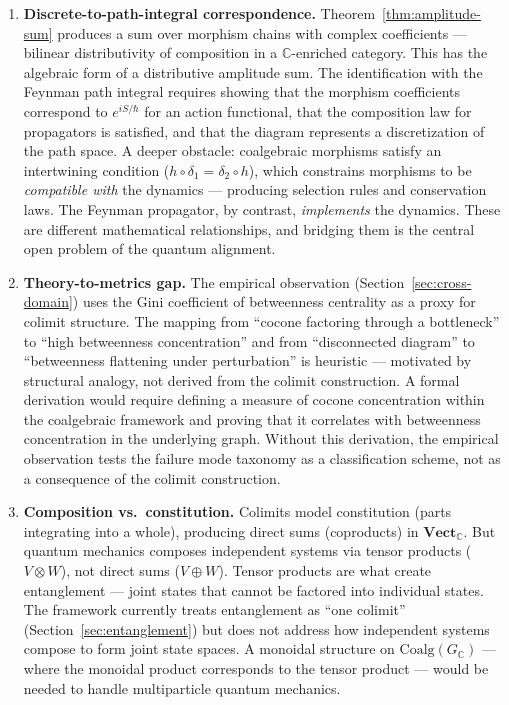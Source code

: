 \documentclass[12pt,a4paper]{article}
\begin{document}
\begin{enumerate}
  \item \label{pp:discrete-to-pi} \textbf{Discrete-to-path-integral correspondence.} Theorem~\ref{thm:amplitude-sum} produces a sum over morphism chains with complex coefficients --- bilinear distributivity of composition in a $\mathbb{C}$-enriched category. This has the algebraic form of a distributive amplitude sum. The identification with the Feynman path integral requires showing that the morphism coefficients correspond to $e^{iS/\hbar}$ for an action functional, that the composition law for propagators is satisfied, and that the diagram represents a discretization of the path space. A deeper obstacle: coalgebraic morphisms satisfy an intertwining condition ($h \circ \delta_1 = \delta_2 \circ h$), which constrains morphisms to be \emph{compatible with} the dynamics --- producing selection rules and conservation laws. The Feynman propagator, by contrast, \emph{implements} the dynamics. These are different mathematical relationships, and bridging them is the central open problem of the quantum alignment.

  \item \label{pp:theory-metrics} \textbf{Theory-to-metrics gap.} The empirical observation (Section~\ref{sec:cross-domain}) uses the Gini coefficient of betweenness centrality as a proxy for colimit structure. The mapping from ``cocone factoring through a bottleneck'' to ``high betweenness concentration'' and from ``disconnected diagram'' to ``betweenness flattening under perturbation'' is heuristic --- motivated by structural analogy, not derived from the colimit construction. A formal derivation would require defining a measure of cocone concentration within the coalgebraic framework and proving that it correlates with betweenness concentration in the underlying graph. Without this derivation, the empirical observation tests the failure mode taxonomy as a classification scheme, not as a consequence of the colimit construction.

  \item \label{pp:composition} \textbf{Composition vs.\ constitution.} Colimits model constitution (parts integrating into a whole), producing direct sums (coproducts) in $\mathbf{Vect}_{\mathbb{C}}$. But quantum mechanics composes independent systems via tensor products ($V \otimes W$), not direct sums ($V \oplus W$). Tensor products are what create entanglement --- joint states that cannot be factored into individual states. The framework currently treats entanglement as ``one colimit'' (Section~\ref{sec:entanglement}) but does not address how independent systems compose to form joint state spaces. A monoidal structure on $\text{Coalg}(G_\mathbb{C})$ --- where the monoidal product corresponds to the tensor product --- would be needed to handle multiparticle quantum mechanics.


\end{enumerate}
\end{document}
